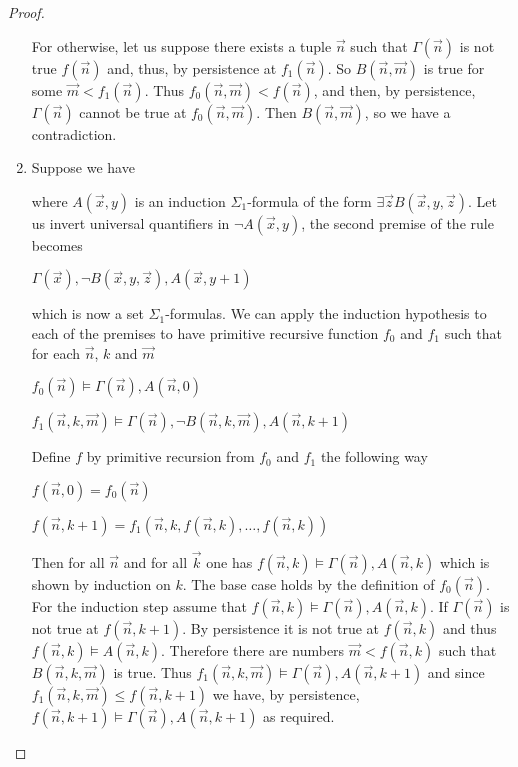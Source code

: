 \documentclass[8pt]{article}
\theoremstyle{definition}
\theoremstyle{definition}
\theoremstyle{definition}
\theoremstyle{definition}
\theoremstyle{definition}
\theoremstyle{definition}
\theoremstyle{definition}
\theoremstyle{definition}
\theoremstyle{definition}
\theoremstyle{definition}
\theoremstyle{definition}
\theoremstyle{definition}
\theoremstyle{definition}
\theoremstyle{question}
\begin{document}
\begin{proof}
\begin{enumerate}
  For otherwise, let us suppose there exists a tuple $\vec{n}$ such that $\Gamma(\vec{n})$ is not true
  $f(\vec{n})$ and, thus, by persistence at $f_1(\vec{n})$. So $B(\vec{n}, \vec{m})$ is true for
  some $\vec{m} < f_1(\vec{n})$. Thus $f_0(\vec{n}, \vec{m}) < f(\vec{n})$, and then, by persistence, $\Gamma(\vec{n})$
  cannot be true at $f_0(\vec{n}, \vec{m})$. Then $B(\vec{n}, \vec{m})$, so we have a contradiction.
  \item Suppose we have
  \begin{prooftree}
  \end{prooftree}
  where $A(\vec{x}, y)$ is an induction $\Sigma_1$-formula of the form $\exists \vec{z} B(\vec{x}, y, \vec{z})$.
  Let us invert universal quantifiers in $\neg A(\vec{x}, y)$, the second premise of the rule becomes
   \begin{center}
     $\Gamma(\vec{x}), \neg B(\vec{x}, y, \vec{z}), A(\vec{x}, y + 1)$
   \end{center}
  which is now a set $\Sigma_1$-formulas. We can apply the induction hypothesis to each of the premises to
  have primitive recursive function $f_0$ and $f_1$ such that for each $\vec{n}$, $k$ and $\vec{m}$
  \begin{center}
    $f_0(\vec{n}) \models \Gamma(\vec{n}), A(\vec{n}, 0)$

    $f_1(\vec{n}, k, \vec{m}) \models \Gamma(\vec{n}), \neg B(\vec{n}, k, \vec{m}), A(\vec{n}, k + 1)$
  \end{center}
  Define $f$ by primitive recursion from $f_0$ and $f_1$ the following way
  \begin{center}
    $f(\vec{n}, 0) = f_0(\vec{n})$

    $f(\vec{n}, k + 1) = f_1(\vec{n}, k, f(\vec{n}, k), \dots, f(\vec{n}, k))$
  \end{center}

  Then for all $\vec{n}$ and for all $\vec{k}$ one has $f(\vec{n}, k) \models \Gamma(\vec{n}), A(\vec{n}, k)$ which is shown
  by induction on $k$.
  The base case holds by the definition of $f_0(\vec{n})$. For the induction step assume that 
  $f(\vec{n}, k) \models \Gamma(\vec{n}), A(\vec{n}, k)$. If $\Gamma(\vec{n})$ is not true at 
  $f(\vec{n}, k + 1)$. By persistence it is not true at $f(\vec{n}, k)$ and thus 
  $f(\vec{n}, k) \models A(\vec{n}, k)$.
  Therefore there are numbers $\vec{m} < f(\vec{n}, k)$ such that $B(\vec{n}, k, \vec{m})$ is true.
  Thus $f_1(\vec{n}, k, \vec{m}) \models \Gamma(\vec{n}), A(\vec{n}, k + 1)$ and since 
  $f_1(\vec{n}, k, \vec{m}) \leq f(\vec{n}, k + 1)$ we have, by persistence, $f(\vec{n}, k + 1) \models \Gamma(\vec{n}), A(\vec{n}, k + 1)$
  as required.


\end{enumerate}
\end{proof}
\end{document}
